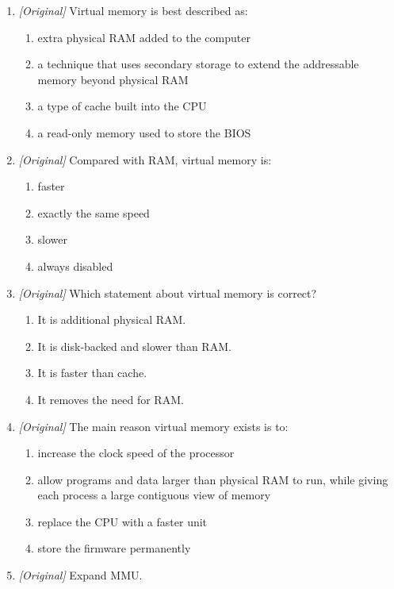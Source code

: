\begin{enumerate}[label=\textbf{Q\arabic*.}, leftmargin=*]
\item \textit{[Original]} Virtual memory is best described as:
  \begin{enumerate}[label=\Alph*.]
    \item extra physical RAM added to the computer
    \item a technique that uses secondary storage to extend the addressable
      memory beyond physical RAM
    \item a type of cache built into the CPU
    \item a read-only memory used to store the BIOS
  \end{enumerate}
\item \textit{[Original]} Compared with RAM, virtual memory is:
  \begin{enumerate}[label=\Alph*.]
    \item faster
    \item exactly the same speed
    \item slower
    \item always disabled
  \end{enumerate}
\item \textit{[Original]} Which statement about virtual memory is correct?
  \begin{enumerate}[label=\Alph*.]
    \item It is additional physical RAM.
    \item It is disk-backed and slower than RAM.
    \item It is faster than cache.
    \item It removes the need for RAM.
  \end{enumerate}
\item \textit{[Original]} The main reason virtual memory exists is to:
  \begin{enumerate}[label=\Alph*.]
    \item increase the clock speed of the processor
    \item allow programs and data larger than physical RAM to run, while
      giving each process a large contiguous view of memory
    \item replace the CPU with a faster unit
    \item store the firmware permanently
  \end{enumerate}
\item \textit{[Original]} Expand MMU.

\end{enumerate}

